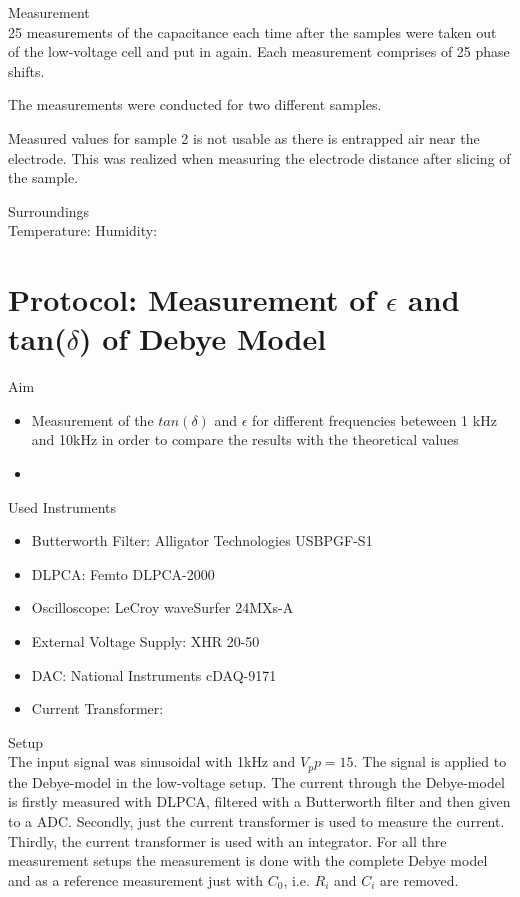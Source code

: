 \large{Measurement} \\
25 measurements of the capacitance each time after the samples were taken out of the low-voltage cell and put in again. Each measurement comprises of 25 phase shifts. 

The measurements were conducted for two different samples.

Measured values for sample 2 is not usable as there is entrapped air near the electrode. This was realized when measuring the electrode distance after slicing of the sample.

\large{Surroundings} \\
Temperature: 
Humidity: 

\section{Protocol: Measurement of $\epsilon$ and tan($\delta$) of Debye Model}
\large{Aim} \\
\begin{itemize}
\item Measurement of the $tan(\delta)$ and $\epsilon$ for different frequencies beteween 1 kHz and 10kHz in order to compare the results with the theoretical values
\item  
\end{itemize}


\large{Used Instruments} 
\begin{itemize}
 \item Butterworth Filter: Alligator Technologies USBPGF-S1
 \item DLPCA: Femto DLPCA-2000
 \item Oscilloscope: LeCroy waveSurfer 24MXs-A
 \item External Voltage Supply:  XHR 20-50
 \item DAC: National Instruments cDAQ-9171
 \item Current Transformer: 

\end{itemize}


\large{Setup} \\
The input signal was  sinusoidal with 1kHz and $V_pp=15$. The signal is applied to the Debye-model in the low-voltage setup. The current through the Debye-model is firstly measured with DLPCA, filtered with a Butterworth filter and then given to a ADC. Secondly, just the current transformer is used to measure the current. Thirdly, the current transformer is used with an integrator. 
For all thre measurement setups the measurement is done with the complete Debye model and as a reference measurement just with $C_0$, i.e. $R_i$ and $C_i$ are removed. 

